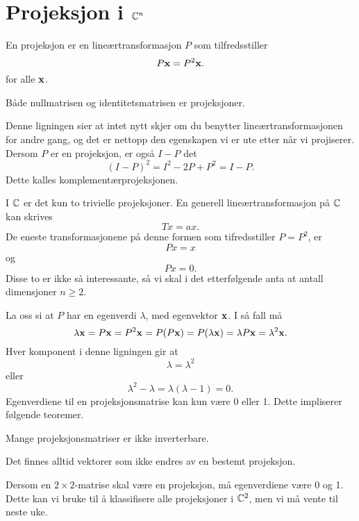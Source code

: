 



 \section*{Projeksjon i $\mathbb{C}^n$}
En projeksjon er en lineærtransformasjon $P$ som tilfredsstiller
\[
 P\mathbf{x}=P^2\mathbf{x}.
 \]
 for alle $\mathbf{x}$. 
 \begin{ex}
Både nullmatrisen og identitetsmatrisen er projeksjoner.
 \end{ex}
 
 Denne ligningen sier at intet nytt skjer om du benytter lineærtransformasjonen for andre gang, 
 og det er nettopp den egenskapen vi er ute etter når vi projiserer. 
 Dersom $P$ er en projeksjon, er også $I-P$ det
\[
 (I-P)^2=I^2-2P+P^2=I-P.
 \]
 Dette kalles komplementærprojeksjonen.
 
 I $\mathbb{C}$ er det kun to trivielle projeksjoner. En generell lineærtransformasjon på $\mathbb{C}$ kan skrives 
 \[
 Tx=ax.
 \]
De eneste transformasjonene på denne formen som tifredsstiller $P=P^2$, er
 \[
 Px=x
\]
og 
 \[
 Px=0.
\]
Disse to er ikke så interessante, så vi skal i det etterfølgende anta at antall dimensjoner $n\geq 2$.

La oss si at $P$ har en egenverdi $\lambda$, med egenvektor $\mathbf{x}$. I så fall må
\[
\lambda \mathbf{x}=P\mathbf{x}=P^2\mathbf{x}=P(P\mathbf{x})=P(\lambda\mathbf{x})=\lambda P\mathbf{x}=\lambda^2 \mathbf{x}.
\]
Hver komponent i denne ligningen gir at
\[
\lambda=\lambda^2
\]
eller
\[
\lambda^2-\lambda=\lambda(\lambda-1)=0.
\]
Egenverdiene til en projeksjonsmatrise kan kun være  0 eller 1. Dette impliserer følgende teoremer.
 
\begin{fishythm}
Mange projeksjonsmatriser er ikke inverterbare.
\end{fishythm}

\begin{thm}
Det finnes alltid vektorer som ikke endres av en bestemt projeksjon.
\end{thm}

Dersom en $2\times 2$-matrise skal være en projeksjon, må egenverdiene være 0 og 1. Dette kan vi bruke til å klassifisere alle projeksjoner i $\mathbb{C}^2$, men vi må vente til neste uke.
 
